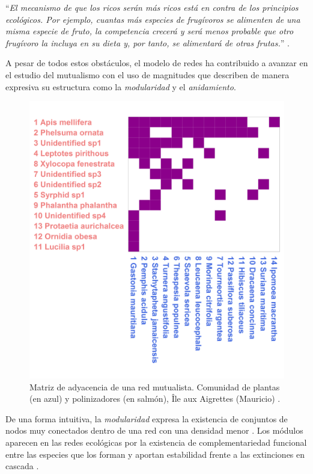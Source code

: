 \enquote{\itshape El mecanismo de que los ricos serán más ricos está en contra de los principios ecológicos. Por ejemplo, cuantas más especies de frugívoros se alimenten de una misma especie de fruto, la competencia crecerá y será menos probable que otro frugívoro la incluya en su dieta y, por tanto, se alimentará de otras frutas.} \cite{montoya2006ecological}.

A pesar de todos estos obstáculos, el modelo de redes ha contribuido a avanzar en el estudio del mutualismo con el uso de magnitudes que describen de manera expresiva su estructura como la \textit{modularidad} y el \textit{anidamiento}.

\begin{figure}[h!]
\centering
\includegraphics[scale=0.35]{Figures/INTRO_M_PL_011a_matrix.png}
\caption{Matriz de adyacencia de una red mutualista. Comunidad de plantas (en azul) y polinizadores (en salmón), Île aux Aigrettes (Mauricio) \cite{olesen2002invasion}.}
\label{fig:INTRO_M_PL_011a_matrix}
\end{figure}

De una forma intuitiva, la \textit{modularidad} expresa la existencia de conjuntos de nodos muy conectados dentro de una red con una densidad menor \cite{newman2006modularity}. Los módulos aparecen en las redes ecológicas por la existencia de complementariedad funcional entre las especies que los forman y aportan estabilidad frente a las extinciones en cascada \cite{olesen2007modularity, thebault2010stability, stouffer2011compartmentalization}.

